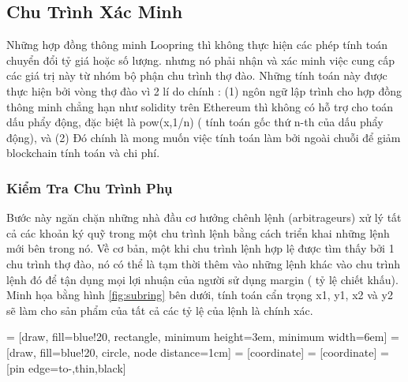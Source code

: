 \documentclass{article}
\makeatletter
\newenvironment{figurehere}
 {\def\@captype{figure}}
 {}
\makeatother
\begin{document}
\begin{multicols}{2}
\subsection{Chu Trình Xác Minh\label{sec:ring_verification}}

Những hợp đồng thông minh Loopring thì không thực hiện các phép tính toán chuyển đổi tỷ giá hoặc số lượng. nhưng nó phải nhận và xác minh việc cung cấp các giá trị này từ nhóm bộ phận chu trình thợ đào. Những tính toán này được thực hiện bởi vòng thợ đào vì 2 lí do chính : (1) ngôn ngữ lập trình cho hợp đồng thông minh chẳng hạn như solidity \cite{dannen2017introducing} trên Ethereum thì không có hỗ trợ cho toán dấu phẩy động, đặc biệt là pow(x,1/n) ( tính toán gốc thứ n-th của dấu phẩy động), và (2) Đó chính là mong muốn việc tính toán làm bởi ngoài chuỗi để giảm blockchain tính toán và chi phí.


\subsubsection{Kiểm Tra Chu Trình Phụ\label{sec:sub_ring_check}}
Bước này ngăn chặn những nhà đầu cơ hưởng chênh lệnh (arbitrageurs) xử lý tất cả các khoản ký quỹ trong một chu trình lệnh bằng cách triển khai những lệnh mới bên trong nó. Về cơ bản, một khi chu trình lệnh hợp lệ được tìm thấy bởi 1 chu trình thợ đào, nó có thể là tạm thời thêm vào những lệnh khác vào chu trình lệnh đó để tận dụng mọi lợi nhuận của người sử dụng margin ( tỷ lệ chiết khấu). Minh họa bằng hình \ref{fig:subring} bên dưới, tính toán cẩn trọng x1, y1, x2 và y2 sẽ làm cho sản phẩm của tất cả các tỷ lệ của lệnh là chính xác.

\begin{center}
\begin{figurehere}
\centering
{} = [draw, fill=blue!20, rectangle, 
    minimum height=3em, minimum width=6em]
 = [draw, fill=blue!20, circle, node distance=1cm]
 = [coordinate]
 = [coordinate]
 = [pin edge={to-,thin,black}]

\end{figurehere}
\end{center}
\end{multicols}
\end{document}
